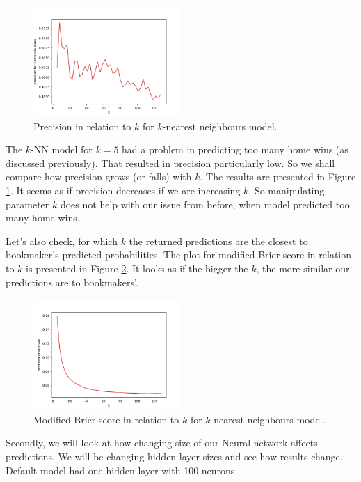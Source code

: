 \documentclass[conference]{IEEEtran}
\begin{document}
\begin{figure}[!ht]
\includegraphics[width=0.5\textwidth]{precision_k_knn.png}
\caption{Precision in relation to $k$ for $k$-nearest neighbours model.}
\label{prec-knn}
\end{figure}

The $k$-NN model for $k=5$ had a problem in predicting too many home wins (as discussed 
previously). That resulted in precision particularly low. So we shall compare how precision
grows (or falls) with $k$. The results are presented in Figure \ref{prec-knn}. It seems as if
precision decreases if we are increasing $k$. So manipulating parameter $k$ does not help with
our issue from before, when model predicted too many home wins.

Let's also check, for which $k$ the returned predictions are the closest to bookmaker's 
predicted probabilities. The plot for modified Brier score in relation to $k$ is presented in Figure \ref{mbs-knn}. It looks as if the bigger the $k$, the more similar our predictions are to bookmakers'.

\begin{figure}[!ht]
\includegraphics[width=0.5\textwidth]{mbs_k_knn.png}
\caption{Modified Brier score in relation to $k$ for $k$-nearest neighbours model.}
\label{mbs-knn}
\end{figure}

Secondly, we will look at how changing size of our Neural network affects predictions.
We will be changing hidden layer sizes and see how results change. Default model had one
hidden layer with 100 neurons.
\end{document}
